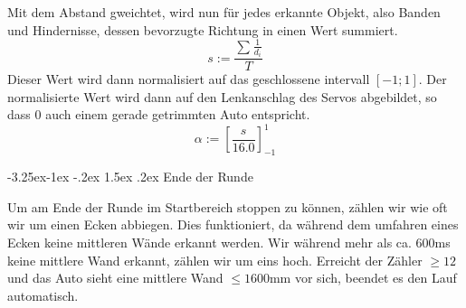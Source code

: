 \documentclass[a4paper]{scrarticle}
\makeatletter
\renewcommand\subsection{\@startsection{subsection}{2}{\z@}%
                                     {-3.25ex\@plus -1ex \@minus -.2ex}%
                                     {1.5ex \@plus .2ex}%
                                     {\Large\AKAfont}}
\makeatother
\begin{document}
Mit dem Abstand gweichtet, wird nun für jedes erkannte Objekt, also Banden und Hindernisse, dessen bevorzugte Richtung in einen Wert summiert.
\[
	s := \frac{\sum_{}\frac{1}{d_i}}{T}
\]
Dieser Wert wird dann normalisiert auf das geschlossene intervall $[-1;1]$. Der normalisierte Wert wird dann auf den Lenkanschlag des Servos abgebildet, so dass 0 auch einem gerade getrimmten Auto entspricht.
\[
	\alpha := [\frac{s}{16.0}]_{-1}^{ 1}	
\]

\subsection{Ende der Runde}

Um am Ende der Runde im Startbereich stoppen zu können, zählen wir wie oft wir um einen Ecken abbiegen.
Dies funktioniert, da während dem umfahren eines Ecken keine mittleren Wände erkannt werden. Wir während mehr als ca. 600ms keine mittlere Wand erkannt, zählen wir um eins hoch. Erreicht der Zähler $\geq 12$ und das Auto sieht eine mittlere Wand $\le 1600$mm vor sich, beendet es den Lauf automatisch.

\clearpage
\end{document}

